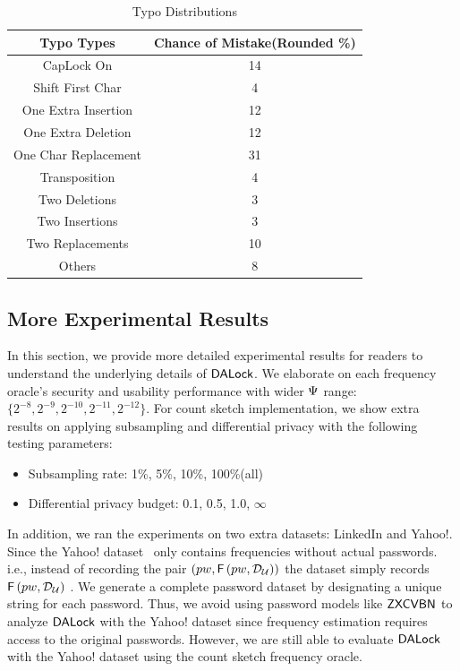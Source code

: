 \begin{table}[h]
	\begin{tabular}{|c|c|}
		\hline
		Typo Types           & Chance of Mistake(Rounded \%) \\ \hline
		CapLock On           & 14                            \\ \hline
		Shift First Char     & 4                             \\ \hline
		One Extra Insertion  & 12                            \\ \hline
		One Extra Deletion   & 12                            \\ \hline
		One Char Replacement & 31                            \\ \hline
		Transposition        & 4                             \\ \hline
		Two Deletions         & 3                             \\ \hline
		Two Insertions        & 3                             \\ \hline
		Two Replacements      & 10                            \\ \hline
		Others               & 8                             \\ \hline
	\end{tabular}
	\caption{Typo Distributions\cite{CCS:CWPCR17}}
	\label{Table:TypoTypes}
	\vspace{-0.5cm}
\end{table}	


\subsection{More Experimental Results}\label{appendix:experimentalResults}
In this section, we provide more detailed experimental results for readers to understand the underlying details of $\mathsf{DALock}$. We elaborate on each frequency oracle's security and usability performance with wider $\Psi$ range: $\{2^{-8}, 2^{-9},2^{-10},2^{-11}, 2^{-12}\}$. For count sketch implementation, we show extra results on applying subsampling and differential privacy with the following testing parameters:
\begin{itemize}
	\item Subsampling rate: 1\%, 5\%, 10\%, 100\%(all)
	\item Differential privacy budget: 0.1, 0.5, 1.0, $\infty$
\end{itemize}

In addition, we ran the experiments on two extra datasets: LinkedIn and Yahoo!. Since the Yahoo! dataset~\cite{SP:Bonneau12,NDSS:BloDatBon16} only contains frequencies without actual passwords. i.e., instead of recording the pair $(pw,  \mathsf{F}\left(pw, \mathcal{D}_{{\mathcal{U}}} \right))$ the dataset simply records $\mathsf{F}\left(pw, \mathcal{D}_{{\mathcal{U}}} \right)$ . We generate a complete password dataset by designating a unique string for each password. Thus, we avoid using password models like $\mathsf{ZXCVBN}$ to analyze $\mathsf{DALock}$ with the Yahoo! dataset since frequency estimation requires access to the original passwords. However, we are still able to evaluate $\mathsf{DALock}$ with the Yahoo! dataset using the count sketch frequency oracle. 

